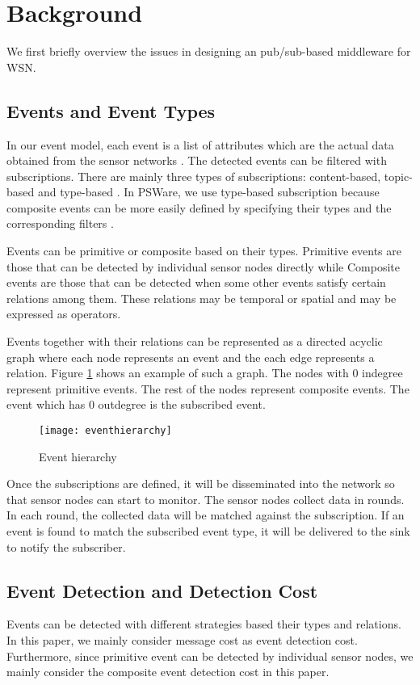 \section{Background}
\label{sec:background}
We first briefly overview the issues in designing an pub/sub-based middleware for WSN.

\subsection{Events and Event Types}
In our event model, each event is a list of attributes which are the actual data obtained from the sensor networks \cite{lowlevelnaming}. The detected events can be filtered with subscriptions. There are mainly three types of subscriptions: content-based, topic-based and type-based \cite{facespubsub}. In PSWare, we use type-based subscription because composite events can be more easily defined by specifying their types and the corresponding filters \cite{siena}.

Events can be primitive or composite based on their types. Primitive events are those that can be detected by individual sensor nodes directly while Composite events are those that can be detected when some other events satisfy certain relations among them. These relations may be temporal or spatial and may be expressed as operators. 

Events together with their relations can be represented as a directed acyclic graph where each node represents an event and the each edge represents a relation. Figure \ref{fig:eventhierarchy} shows an example of such a graph. The nodes with 0 indegree represent primitive events. The rest of the nodes represent composite events. The event which has 0 outdegree is the subscribed event.

\begin{figure}
\centering
\texttt{[image: eventhierarchy]}
\caption{Event hierarchy}
\label{fig:eventhierarchy}
\end{figure}

Once the subscriptions are defined, it will be disseminated into the network so that sensor nodes can start to monitor. The sensor nodes collect data in rounds. In each round, the collected data will be matched against the subscription. If an event is found to match the subscribed event type, it will be delivered to the sink to notify the subscriber.

\subsection{Event Detection and Detection Cost}
Events can be detected with different strategies based their types and relations. In this paper, we mainly consider message cost as event detection cost. Furthermore, since primitive event can be detected by individual sensor nodes, we mainly consider the composite event detection cost in this paper.

